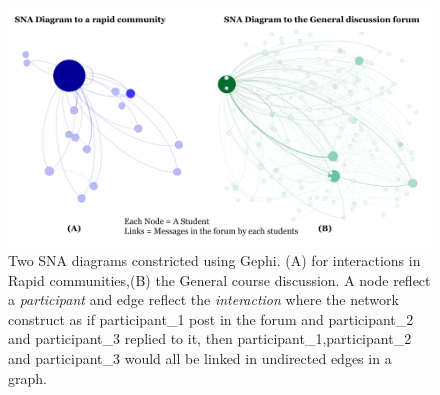 \documentclass[manuscript,screen,review]{acmart}
\begin{document}
\begin{figure}[h]
  \centering
  \includegraphics[width=\linewidth]{images/SNA Diagrams.png}
  \caption{Two SNA diagrams constricted using Gephi. (A) for interactions in Rapid communities,(B) the General course discussion.  A node reflect a \textit{participant} and edge reflect the \textit{interaction} where the network construct as if participant\_1 post in the forum and participant\_2 and participant\_3 replied to it, then participant\_1,participant\_2 and participant\_3 would all be linked in undirected edges in a graph.}
 \label{fig:SNA}
\end{figure}
\end{document}
